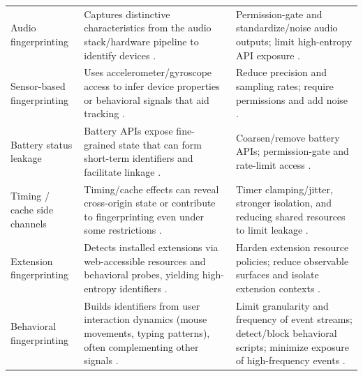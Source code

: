 \begin{table}[t]
\begin{tabularx}{\textwidth}{p{2.8cm} Y Y}
Audio fingerprinting &
Captures distinctive characteristics from the audio stack/hardware pipeline to identify devices \cite{chaliseYourSpeakerMy2022}. &
Permission-gate and standardize/noise audio outputs; limit high-entropy API exposure \cite{rescorlaTechnicalCommentsPrivacy2021}. \\

Sensor-based fingerprinting &
Uses accelerometer/gyroscope access to infer device properties or behavioral signals that aid tracking \cite{dasTrackingMobileWeb2016,dasWebsSixthSense2018}. &
Reduce precision and sampling rates; require permissions and add noise \cite{dasWebsSixthSense2018}. \\

Battery status leakage &
Battery APIs expose fine-grained state that can form short-term identifiers and facilitate linkage \cite{olejnikLeakingBatteryPrivacy2016,olejnikBatteryStatusNot2017}. &
Coarsen/remove battery APIs; permission-gate and rate-limit access \cite{olejnikBatteryStatusNot2017}. \\

Timing / cache side channels &
Timing/cache effects can reveal cross-origin state or contribute to fingerprinting even under some restrictions \cite{sanchez-rolaClockClockTimeBased2018,weinbergStillKnowWhat2011,shusterman2021prime+,jinTimingBasedBrowsingPrivacy2022}. &
Timer clamping/jitter, stronger isolation, and reducing shared resources to limit leakage \cite{sanchez-rolaClockClockTimeBased2018,rescorlaTechnicalCommentsPrivacy2021}. \\

Extension fingerprinting &
Detects installed extensions via web-accessible resources and behavioral probes, yielding high-entropy identifiers \cite{starovXHOUNDQuantifyingFingerprintability2017,trickelEveryoneDifferentClientside2019,karamiCarnusExploringPrivacy2020,karamiUnleashSimulacrumShifting2022,agarwalPeekingWindowFingerprinting2024}. &
Harden extension resource policies; reduce observable surfaces and isolate extension contexts \cite{laperdrixFingerprintingStyleDetecting2021}. \\

Behavioral fingerprinting &
Builds identifiers from user interaction dynamics (mouse movements, typing patterns), often complementing other signals \cite{leivaMyMouseMy2021,yuanCrossdeviceTrackingIdentification2018}. &
Limit granularity and frequency of event streams; detect/block behavioral scripts; minimize exposure of high-frequency events \cite{leivaMyMouseMy2021}. \\


\end{tabularx}
\end{table}
